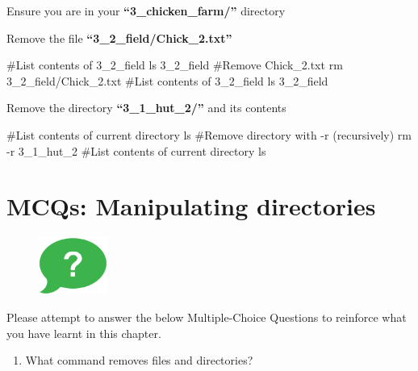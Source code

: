 \documentclass[
  letterpaper,
  DIV=11,
  numbers=noendperiod]{scrreprt}
\newenvironment{Shaded}{\begin{snugshade}}{\end{snugshade}}
\newcommand{\AttributeTok}[1]{\textcolor[rgb]{0.40,0.45,0.13}{#1}}
\newcommand{\CommentTok}[1]{\textcolor[rgb]{0.37,0.37,0.37}{#1}}
\newcommand{\FunctionTok}[1]{\textcolor[rgb]{0.28,0.35,0.67}{#1}}
\newcommand{\NormalTok}[1]{\textcolor[rgb]{0.00,0.23,0.31}{#1}}
\providecommand{\tightlist}{%
  \setlength{\itemsep}{0pt}\setlength{\parskip}{0pt}}\usepackage{longtable,booktabs,array}
\begin{document}
Ensure you are in your \textbf{``3\_chicken\_farm/''} directory

Remove the file \textbf{``3\_2\_field/Chick\_2.txt''}

\begin{Shaded}
\begin{Highlighting}[]
\CommentTok{\#List contents of 3\_2\_field}
\FunctionTok{ls}\NormalTok{ 3\_2\_field}
\CommentTok{\#Remove Chick\_2.txt}
\FunctionTok{rm}\NormalTok{ 3\_2\_field/Chick\_2.txt}
\CommentTok{\#List contents of 3\_2\_field}
\FunctionTok{ls}\NormalTok{ 3\_2\_field}
\end{Highlighting}
\end{Shaded}

Remove the directory \textbf{``3\_1\_hut\_2/''} and its contents

\begin{Shaded}
\begin{Highlighting}[]
\CommentTok{\#List contents of current directory}
\FunctionTok{ls}
\CommentTok{\#Remove directory with {-}r (recursively)}
\FunctionTok{rm} \AttributeTok{{-}r}\NormalTok{  3\_1\_hut\_2}
\CommentTok{\#List contents of current directory}
\FunctionTok{ls}
\end{Highlighting}
\end{Shaded}

\hypertarget{mcqs-manipulating-directories}{%
\section{MCQs: Manipulating
directories}\label{mcqs-manipulating-directories}}

\begin{figure}

{\centering \includegraphics[width=0.2\textwidth,height=\textheight]{figures/question_bubble_green.png}

}

\end{figure}

Please attempt to answer the below Multiple-Choice Questions to
reinforce what you have learnt in this chapter.

\begin{enumerate}
\def\labelenumi{\arabic{enumi}.}
\tightlist
\item
  What command removes files and directories?
\end{enumerate}
\end{document}
